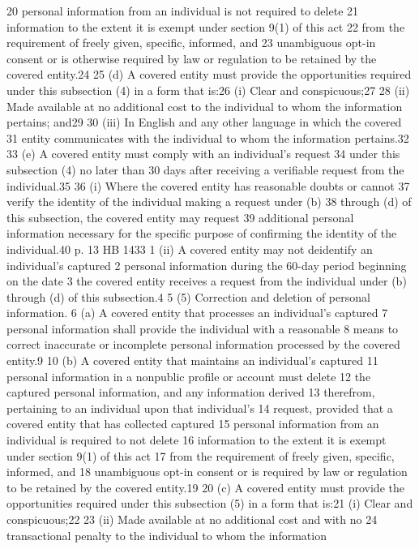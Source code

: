 20 personal information from an individual is not required to delete
21 information to the extent it is exempt under section 9(1) of this act
22 from the requirement of freely given, specific, informed, and
23 unambiguous opt-in consent or is otherwise required by law or
regulation to be retained by the covered entity.24
25 (d) A covered entity must provide the opportunities required
under this subsection (4) in a form that is:26
(i) Clear and conspicuous;27
28 (ii) Made available at no additional cost to the individual to
whom the information pertains; and29
30 (iii) In English and any other language in which the covered
31 entity communicates with the individual to whom the information
pertains.32
33 (e) A covered entity must comply with an individual's request
34 under this subsection (4) no later than 30 days after receiving a
verifiable request from the individual.35
36 (i) Where the covered entity has reasonable doubts or cannot
37 verify the identity of the individual making a request under (b)
38 through (d) of this subsection, the covered entity may request
39 additional personal information necessary for the specific purpose of
confirming the identity of the individual.40
p. 13 HB 1433
1 (ii) A covered entity may not deidentify an individual's captured
2 personal information during the 60-day period beginning on the date
3 the covered entity receives a request from the individual under (b)
through (d) of this subsection.4
5 (5) Correction and deletion of personal information.
6 (a) A covered entity that processes an individual's captured
7 personal information shall provide the individual with a reasonable
8 means to correct inaccurate or incomplete personal information
processed by the covered entity.9
10 (b) A covered entity that maintains an individual's captured
11 personal information in a nonpublic profile or account must delete
12 the captured personal information, and any information derived
13 therefrom, pertaining to an individual upon that individual's
14 request, provided that a covered entity that has collected captured
15 personal information from an individual is required to not delete
16 information to the extent it is exempt under section 9(1) of this act
17 from the requirement of freely given, specific, informed, and
18 unambiguous opt-in consent or is required by law or regulation to be
retained by the covered entity.19
20 (c) A covered entity must provide the opportunities required
under this subsection (5) in a form that is:21
(i) Clear and conspicuous;22
23 (ii) Made available at no additional cost and with no
24 transactional penalty to the individual to whom the information
